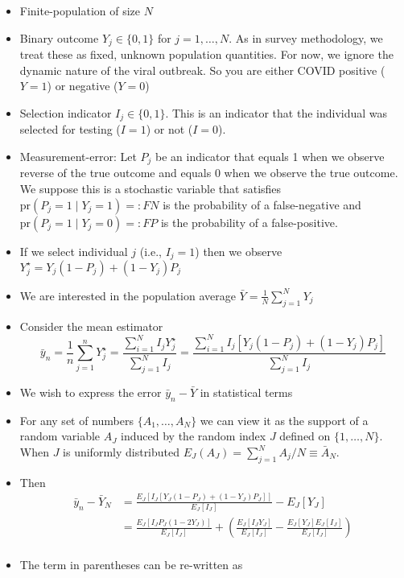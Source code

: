 \documentclass[12pt]{article}
\numberwithin{equation}{section}
\theoremstyle{plain}
\def\pr{\text{pr}}
\begin{document}
\begin{itemize}
\item Finite-population of size $N$
\item Binary outcome $Y_j \in \{0,1\}$ for $j=1,\ldots, N$.  As in survey methodology, we treat these as fixed, unknown population quantities. For now, we ignore the dynamic nature of the viral outbreak. So you are either COVID positive ($Y=1$) or negative ($Y=0$)
\item Selection indicator $I_j \in \{0,1\}$.  This is an indicator that the individual was selected for testing ($I = 1$) or not ($I=0$).
\item Measurement-error: Let $P_j$ be an indicator that equals 1 when we observe reverse of the true outcome and equals 0 when we observe the true outcome. We suppose this is a stochastic variable that satisfies $\pr(P_j = 1 \mid Y_j = 1) =: FN$ is the probability of a false-negative and $\pr(P_j = 1 \mid Y_j = 0) =: FP$ is the probability of a false-positive.
\item If we select individual $j$ (i.e., $I_j = 1$) then we observe $Y_j^\star = Y_j(1-P_j) + (1-Y_j) P_j$
\item  We are interested in the population average $\bar Y = \frac{1}{N} \sum_{j=1}^N Y_j$
\item Consider the mean estimator
$$
\bar y_n = \frac{1}{n} \sum_{j=1}^n Y_j^\star = \frac{\sum_{i=1}^N  I_j Y_j^\star }{\sum_{j=1}^N  I_j } = \frac{\sum_{i=1}^N  I_j \left[ Y_j (1-P_j) + (1-Y_j) P_j \right]}{\sum_{j=1}^N  I_j }
$$
\item We wish to express the error $\bar y_n - \bar Y$ in statistical terms
\item For any set of numbers $\{ A_1, \ldots, A_N \}$ we can view it as the support of a random variable $A_J$ induced by the random index $J$ defined on $\{1,\ldots, N\}$.  When $J$ is uniformly distributed $E_J (A_J) = \sum_{j=1}^N A_j / N \equiv \bar A_N$.
\item Then
$$
\begin{aligned}
\bar y_n  - \bar Y_N &= \frac{E_J \left[ I_J \left[ Y_J (1-P_J) + (1-Y_J) P_J \right] \right]}{E_J [ I_J ] } - E_J[Y_J] \\
&= \frac{E_J \left[ I_J P_J (1-2Y_J) \right]}{E_J [ I_J ] } + \left( \frac{E_J [I_J Y_J]}{E_J [ I_J ] } - \frac{E_J[Y_J] E_J[I_J]}{E_J[I_J]} \right) \\
\end{aligned}
$$
\item The term in parentheses can be re-written as
$$
$$
\end{itemize}
\end{document}
